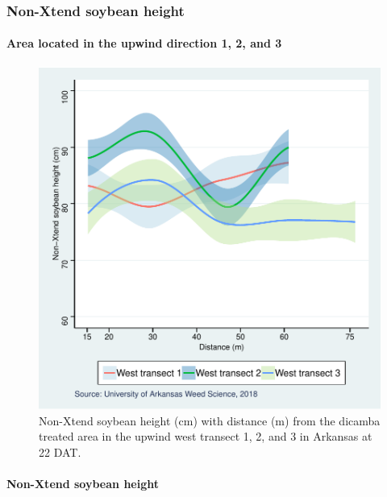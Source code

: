 \documentclass[]{article}
\let\oldparagraph\paragraph
\renewcommand{\paragraph}[1]{\oldparagraph{#1}\mbox{}}
\begin{document}
\newpage

\subsubsection{Non-Xtend soybean height}\label{non-xtend-soybean-height}

\paragraph{\texorpdfstring{Area located in the \textbf{upwind} direction
1, 2, and
3}{Area located in the upwind direction 1, 2, and 3}}\label{area-located-in-the-upwind-direction-1-2-and-3-1}

\begin{figure}
\centering
\includegraphics{Report_files/figure-latex/unnamed-chunk-17-1.pdf}
\caption{Non-Xtend soybean height (cm) with distance (m) from the
dicamba treated area in the upwind west transect 1, 2, and 3 in Arkansas
at 22 DAT.}
\end{figure}

\pagebreak
\newpage

\paragraph{Non-Xtend soybean height}\label{non-xtend-soybean-height-1}
\end{document}

